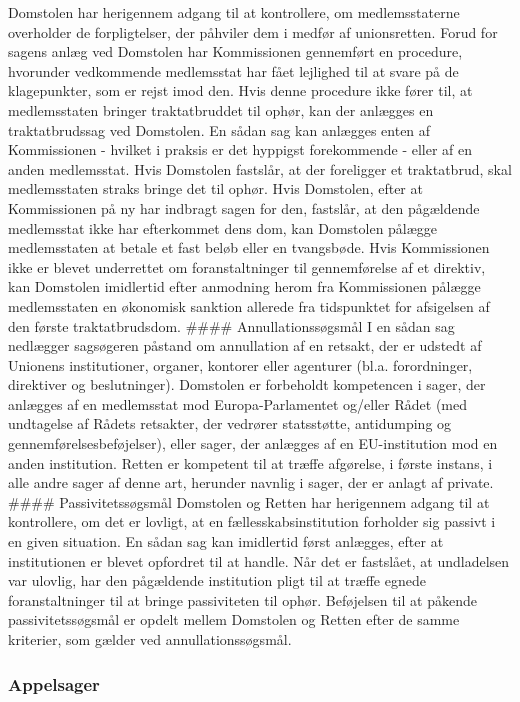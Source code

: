 \documentclass[]{book}
\begin{document}
Domstolen har herigennem adgang til at kontrollere, om medlemsstaterne overholder de forpligtelser, der påhviler dem i medfør af unionsretten. Forud for sagens anlæg ved Domstolen har Kommissionen gennemført en procedure, hvorunder vedkommende medlemsstat har fået lejlighed til at svare på de klagepunkter, som er rejst imod den. Hvis denne procedure ikke fører til, at medlemsstaten bringer traktatbruddet til ophør, kan der anlægges en traktatbrudssag ved Domstolen.
En sådan sag kan anlægges enten af Kommissionen - hvilket i praksis er det hyppigst forekommende - eller af en anden medlemsstat. Hvis Domstolen fastslår, at der foreligger et traktatbrud, skal medlemsstaten straks bringe det til ophør. Hvis Domstolen, efter at Kommissionen på ny har indbragt sagen for den, fastslår, at den pågældende medlemsstat ikke har efterkommet dens dom, kan Domstolen pålægge medlemsstaten at betale et fast beløb eller en tvangsbøde. Hvis Kommissionen ikke er blevet underrettet om foranstaltninger til gennemførelse af et direktiv, kan Domstolen imidlertid efter anmodning herom fra Kommissionen pålægge medlemsstaten en økonomisk sanktion allerede fra tidspunktet for afsigelsen af den første traktatbrudsdom.
\#\#\#\# Annullationssøgsmål
I en sådan sag nedlægger sagsøgeren påstand om annullation af en retsakt, der er udstedt af Unionens institutioner, organer, kontorer eller agenturer (bl.a. forordninger, direktiver og beslutninger). Domstolen er forbeholdt kompetencen i sager, der anlægges af en medlemsstat mod Europa-Parlamentet og/eller Rådet (med undtagelse af Rådets retsakter, der vedrører statsstøtte, antidumping og gennemførelsesbeføjelser), eller sager, der anlægges af en EU-institution mod en anden institution. Retten er kompetent til at træffe afgørelse, i første instans, i alle andre sager af denne art, herunder navnlig i sager, der er anlagt af private.
\#\#\#\# Passivitetssøgsmål
Domstolen og Retten har herigennem adgang til at kontrollere, om det er lovligt, at en fællesskabsinstitution forholder sig passivt i en given situation. En sådan sag kan imidlertid først anlægges, efter at institutionen er blevet opfordret til at handle. Når det er fastslået, at undladelsen var ulovlig, har den pågældende institution pligt til at træffe egnede foranstaltninger til at bringe passiviteten til ophør. Beføjelsen til at påkende passivitetssøgsmål er opdelt mellem Domstolen og Retten efter de samme kriterier, som gælder ved annullationssøgsmål.

\hypertarget{appelsager}{%
\subsubsection{Appelsager}\label{appelsager}}
\end{document}
